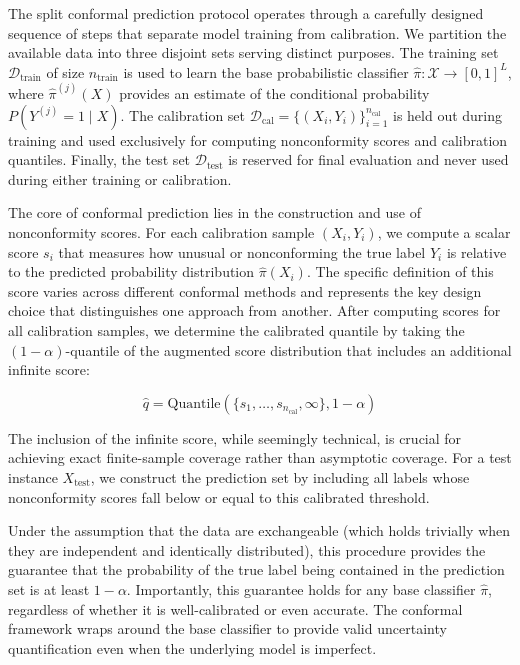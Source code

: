 The split conformal prediction protocol operates through a carefully designed sequence of steps that separate model training from calibration.
We partition the available data into three disjoint sets serving distinct purposes.
The training set $\mathcal{D}_{\text{train}}$ of size $n_{\text{train}}$ is used to learn the base probabilistic classifier $\hat{\pi}: \mathcal{X} \to [0,1]^L$, where $\hat{\pi}^{(j)}(X)$ provides an estimate of the conditional probability $P(Y^{(j)} = 1 \mid X)$.
The calibration set $\mathcal{D}_{\text{cal}} = \{(X_i, Y_i)\}_{i=1}^{n_{\text{cal}}}$ is held out during training and used exclusively for computing nonconformity scores and calibration quantiles.
Finally, the test set $\mathcal{D}_{\text{test}}$ is reserved for final evaluation and never used during either training or calibration.

The core of conformal prediction lies in the construction and use of nonconformity scores.
For each calibration sample $(X_i, Y_i)$, we compute a scalar score $s_i$ that measures how unusual or nonconforming the true label $Y_i$ is relative to the predicted probability distribution $\hat{\pi}(X_i)$.
The specific definition of this score varies across different conformal methods and represents the key design choice that distinguishes one approach from another.
After computing scores for all calibration samples, we determine the calibrated quantile by taking the $(1-\alpha)$-quantile of the augmented score distribution that includes an additional infinite score:

\begin{equation}
\hat{q} = \text{Quantile}\left(\{s_1, \ldots, s_{n_{\text{cal}}}, \infty\}, 1-\alpha\right)\label{eq:equation2}
\end{equation}

The inclusion of the infinite score, while seemingly technical, is crucial for achieving exact finite-sample coverage rather than asymptotic coverage.
For a test instance $X_{\text{test}}$, we construct the prediction set by including all labels whose nonconformity scores fall below or equal to this calibrated threshold.

Under the assumption that the data are exchangeable (which holds trivially when they are independent and identically distributed), this procedure provides the guarantee that the probability of the true label being contained in the prediction set is at least $1-\alpha$.
Importantly, this guarantee holds for any base classifier $\hat{\pi}$, regardless of whether it is well-calibrated or even accurate.
The conformal framework wraps around the base classifier to provide valid uncertainty quantification even when the underlying model is imperfect.

